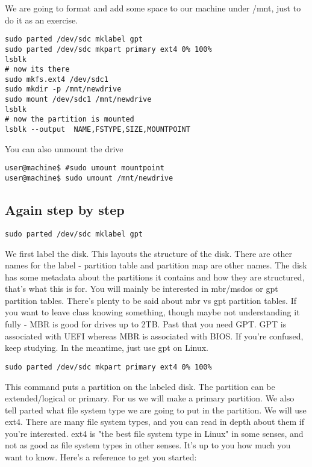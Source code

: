 \documentclass[10pt]{article}
\begin{document}
We are going to format and add some space to our machine under /mnt, just to do it as an exercise.

\begin{lstlisting}
sudo parted /dev/sdc mklabel gpt
sudo parted /dev/sdc mkpart primary ext4 0% 100%
lsblk
# now its there
sudo mkfs.ext4 /dev/sdc1
sudo mkdir -p /mnt/newdrive
sudo mount /dev/sdc1 /mnt/newdrive
lsblk
# now the partition is mounted
lsblk --output  NAME,FSTYPE,SIZE,MOUNTPOINT
\end{lstlisting}
You can also unmount the drive

\begin{lstlisting}
user@machine$ #sudo umount mountpoint
user@machine$ sudo umount /mnt/newdrive
\end{lstlisting}

\subsection{ Again step by step}

\begin{lstlisting}
sudo parted /dev/sdc mklabel gpt
\end{lstlisting}

We first label the disk. This layouts the structure of the disk. There are other names for the label - partition table and partition map are other names. The disk has some metadata about the partitions it contains and how they are structured, that's what this is for. You will mainly be interested in mbr/msdos or gpt partition tables. There's plenty to be said about mbr vs gpt partition tables. If you want to leave class knowing something, though maybe not understanding it fully - MBR is good for drives up to 2TB. Past that you need GPT. GPT is associated with UEFI whereas MBR is associated with BIOS. If you're confused, keep studying. In the meantime, just use gpt on Linux.

\begin{lstlisting}
sudo parted /dev/sdc mkpart primary ext4 0% 100%
\end{lstlisting}

This command puts a partition on the labeled disk. The partition can be extended/logical or primary. For us we will make a primary partition. We also tell parted what file system type we are going to put in the partition. We will use ext4. There are many file system types, and you can read in depth about them if you're interested. ext4 is "the best file system type in Linux" in some senses, and not as good as file system types in other senses. It's up to you how much you want to know. Here's a reference to get you started:
\end{document}
